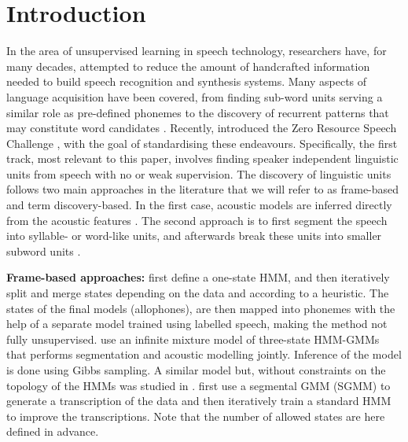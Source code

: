 \section{Introduction}
\label{sec:introduction}
In the area of unsupervised learning in speech technology, researchers have, for many decades, attempted to reduce the amount of handcrafted information needed to build speech recognition and synthesis systems.
Many aspects of language acquisition have been covered, from finding sub-word units serving a similar role as pre-defined phonemes \parencite{LeeEtAl1988,SvendsenEtAl1989,BacchianiEtAl1996,huijbregts2011unsupervised, OGrady:2008up} to the discovery of recurrent patterns that may constitute word candidates \cite{Rasanen2011149, park2008unsupervised, Aimetti2010, StoutenEtAl2008phonepatterns, DriesenEtAl2009adaptivenon-negative, gs:VanhainenAndSalvi2012Interspeech, gs:VanhainenAndSalvi2014ICASSP}.
Recently, \citeauthor{versteegh2015zero} introduced the Zero Resource Speech Challenge \parencite{versteegh2015zero}, with the goal of standardising these endeavours.
Specifically, the first track, most relevant to this paper, involves finding speaker independent linguistic units from speech with no or weak supervision.
The discovery of linguistic units follows two main approaches in the literature that we will refer to as frame-based and term discovery-based. 
In the first case, acoustic models are inferred directly from the acoustic features \parencite{varadarajan2008unsupervised, lee2012nonparametric, siu2014unsupervised, chen2015parallel, zhang2010towards, versteegh2016zero, heck2016unsupervised, synnaeve2016temporal}.
The second approach is to first segment the speech into syllable- or word-like units, and afterwards break these units into smaller subword units \parencite{jansen2013weak, park2008unsupervised, jansen2011efficient, versteegh2015zero, jansen2011towards, jansen2013weak, synnaeve2014phonetics, thiolliere2015hybrid, versteegh2016zero, zeghidour2016deep, kamper2015unsupervised, renshaw2015comparison}.


\textbf{Frame-based approaches:}
\textcite{varadarajan2008unsupervised} first define a one-state HMM, and then iteratively split and merge states depending on the data and according to a heuristic.
The states of the final models (allophones), are then mapped into phonemes with the help of a separate model trained using labelled speech, making the method not fully unsupervised.
\textcite{lee2012nonparametric} use an infinite mixture model of three-state HMM-GMMs that performs segmentation and acoustic modelling jointly.
Inference of the model is done using Gibbs sampling.
A similar model but, without constraints on the topology of the HMMs was studied in \parencite{gs:VanhainenAndSalvi2014ICASSP}.
\textcite{siu2014unsupervised} first use a segmental GMM (SGMM) to generate a transcription of the data and then iteratively train a standard HMM to improve the transcriptions.
Note that the number of allowed states are here defined in advance.

